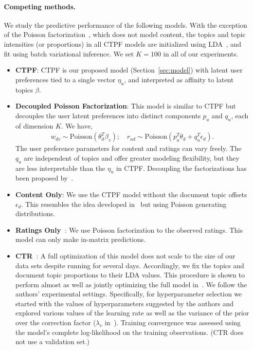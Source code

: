 \documentclass{article}
\newcommand{\mysec}[1]{Section~\ref{sec:#1}}
\newcommand{\Pois}{\textrm{Poisson}}
\begin{document}
\paragraph{Competing methods.} We study the predictive performance of the
following models. With the exception of the Poisson
factorization~\cite{Gopalan:2013b}, which does not model content, the
topics and topic intensities (or proportions) in all CTPF models are
initialized using LDA~\cite{Blei:2003b}, and fit using batch
variational inference. We set $K=100$ in all of our experiments.

\begin{itemize}
\item {\bf CTPF}: CTPF is our proposed model (\mysec{model}) with
  latent user preferences tied to a single vector $\eta_u$, and
  interpreted as affinity to latent topics $\beta$.

\item {\bf Decoupled Poisson Factorization}: This model is similar to
  CTPF but decouples the user latent preferences into distinct
  components $p_u$ and $q_u$, each of dimension $K$. We have,
\begin{align}
w_{dv} \sim \Pois(\theta_d^T \beta_v); \quad  r_{ud} \sim \Pois(p_u^T\theta_d + q_u^T\epsilon_d).  
\label{eq:decoupled} 
\end{align}
The user preference parameters for content and ratings can vary
freely.  The $q_u$ are independent of topics and offer greater
modeling flexibility, but they are less interpretable than the
$\eta_u$ in CTPF. Decoupling the factorizations has been proposed
by~\citet{Porteous:2010}.

\item {\bf Content Only}: We use the CTPF model without the document
  topic offsets $\epsilon_d$. This resembles the idea developed
  in~\cite{Agarwal:2010} but using Poisson generating distributions.

\item {\bf Ratings Only~\cite{Gopalan:2013b}}: We use Poisson
  factorization to the observed ratings. This model can only make
  in-matrix predictions.

\item {\bf CTR~\cite{Wang:2011a}}: A full optimization of this model
  does not scale to the size of our data sets despite running for
  several days. Accordingly, we fix the topics and document topic
  proportions to their LDA values. This procedure is shown to perform
  almost as well as jointly optimizing the full model
  in~\cite{Wang:2011a}. We follow the authors' experimental settings.
  Specifically, for hyperparameter selection we started with the
  values of hyperparameters suggested by the authors and explored
  various values of the learning rate as well as the variance of the
  prior over the correction factor ($\lambda_v$
  in~\cite{Wang:2011a}). Training convergence was assessed using the
  model's complete log-likelihood on the training observations. (CTR
  does not use a validation set.)
\end{itemize}
\end{document}
